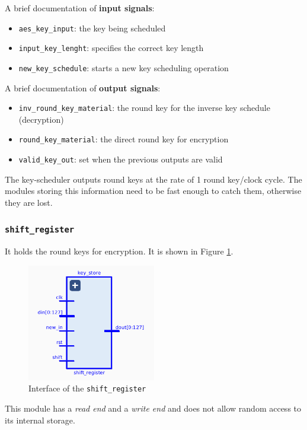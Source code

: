 A brief documentation of \textbf{input signals}:
\begin{itemize}
	\item \texttt{aes\_key\_input}: the key being scheduled
	\item \texttt{input\_key\_lenght}: specifies the correct key length
	\item \texttt{new\_key\_schedule}: starts a new key scheduling operation
\end{itemize}

A brief documentation of \textbf{output signals}:
\begin{itemize}
	\item \texttt{inv\_round\_key\_material}: the round key for the inverse key schedule (decryption)
	\item \texttt{round\_key\_material}: the direct round key for encryption
	\item \texttt{valid\_key\_out}: set when the previous outputs are valid
\end{itemize}

The key-scheduler outputs round keys at the rate of 1 round key/clock cycle.
The modules storing this information need to be fast enough to catch them, otherwise
they are lost.

\subsubsection{\texttt{shift\_register}}

It holds the round keys for encryption. It is shown in Figure \ref{fig:key_store}.

\begin{figure}[h]
  \centering
  \includegraphics[width=0.5\textwidth]{figures/key_store}
	  \caption{Interface of the \texttt{shift\_register}}
  \label{fig:key_store}
\end{figure}

This module has a \textit{read end} and a \textit{write end} and does not allow
random access to its internal storage.

